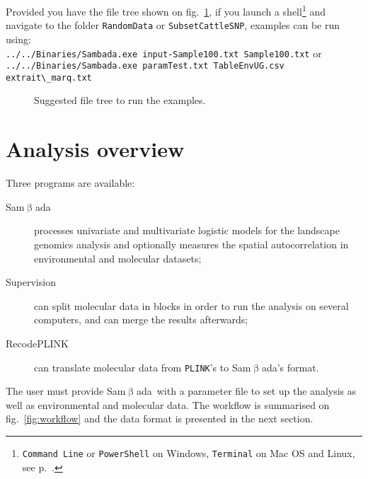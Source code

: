 \documentclass[a4paper,11pt]{article}
\newcommand{\smb}{\textsf{Sam$\upbeta$ada}}
\newcommand{\prog}[1]{\texttt{#1}}
\begin{document}
Provided you have the file tree shown on fig.~\ref{fig:filetree},
if you launch a shell\footnote{\prog{Command Line} or \prog{PowerShell} on Windows, \prog{Terminal} on Mac OS and Linux, see p.~\pageref{faq:commandline}.} and navigate to the folder \prog{RandomData} or \prog{SubsetCattleSNP}, examples can be run using: \\
\verb+../../Binaries/Sambada.exe input-Sample100.txt Sample100.txt+ or\\
\verb+../../Binaries/Sambada.exe paramTest.txt TableEnvUG.csv extrait\_marq.txt+
\label{sec:examples-launch}

\begin{figure}[htbp]
\caption{Suggested file tree to run the examples.}
\label{fig:filetree}
\end{figure}

\clearpage

\section{Analysis overview}

Three programs are available:
\begin{description}
\item[\smb] processes univariate and multivariate logistic models for the landscape genomics analysis and optionally measures the spatial autocorrelation in environmental and molecular datasets;
\item[Supervision] can split molecular data in blocks in order to run the analysis on several computers, and can merge the results afterwards;
\item[RecodePLINK] can translate molecular data from \prog{PLINK}'s to \smb's format.
\end{description}

The user must provide \smb\ with a parameter file to set up the analysis as well as environmental and molecular data.
The workflow is summarised on fig.~\ref{fig:workflow} and the data format is presented in the next section.
\end{document}
